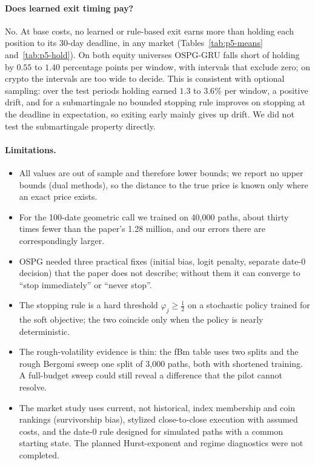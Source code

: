 \paragraph{Does learned exit timing pay?}
No. At base costs, no learned or rule-based exit earns more than holding each position to
its 30-day deadline, in any market (Tables~\ref{tab:p5-means} and~\ref{tab:p5-hold}). On
both equity universes OSPG-GRU falls short of holding by $0.55$ to $1.40$ percentage points
per window, with intervals that exclude zero; on crypto the intervals are too wide to
decide. This is consistent with optional sampling: over the test periods holding earned
$1.3$ to $3.6\%$ per window, a positive drift, and for a submartingale no bounded stopping
rule improves on stopping at the deadline in expectation, so exiting early mainly gives up
drift. We did not test the submartingale property directly.

\paragraph{Limitations.}
\begin{itemize}
\item All values are out of sample and therefore lower bounds; we report no upper bounds
  (dual methods), so the distance to the true price is known only where an exact price exists.
\item For the 100-date geometric call we trained on 40{,}000 paths, about thirty times fewer
  than the paper's 1.28 million, and our errors there are correspondingly larger.
\item OSPG needed three practical fixes (initial bias, logit penalty, separate date-0
  decision) that the paper does not describe; without them it can converge to ``stop
  immediately'' or ``never stop''.
\item The stopping rule is a hard threshold $\varphi_j\ge\frac12$ on a stochastic policy
  trained for the soft objective; the two coincide only when the policy is nearly
  deterministic.
\item The rough-volatility evidence is thin: the fBm table uses two splits and the rough
  Bergomi sweep one split of 3{,}000 paths, both with shortened training. A full-budget
  sweep could still reveal a difference that the pilot cannot resolve.
\item The market study uses current, not historical, index membership and coin rankings
  (survivorship bias), stylized close-to-close execution with assumed costs, and the
  date-0 rule designed for simulated paths with a common starting state. The planned
  Hurst-exponent and regime diagnostics were not completed.
\end{itemize}
